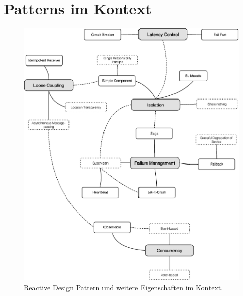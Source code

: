 \section{Patterns im Kontext}

\begin{figure}[H]
 \centering
 \includegraphics[width=1.0\textwidth]{4-Hauptteil/context/context.eps}
 \caption{Reactive Design Pattern und weitere Eigenschaften im Kontext.}
 \label{fig:patterns-context}
\end{figure}
